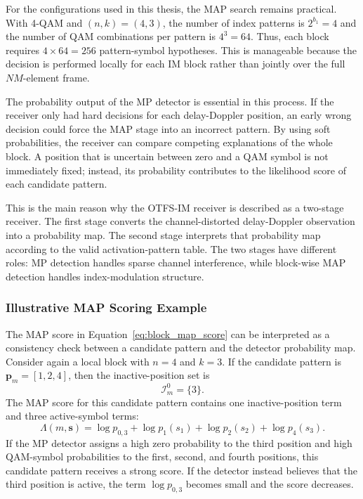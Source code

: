 For the configurations used in this thesis, the MAP search remains practical. With 4-QAM and \((n,k)=(4,3)\), the number of index patterns is \(2^{b_1}=4\) and the number of QAM combinations per pattern is \(4^3=64\). Thus, each block requires \(4\times64=256\) pattern-symbol hypotheses. This is manageable because the decision is performed locally for each IM block rather than jointly over the full \(NM\)-element frame.

The probability output of the MP detector is essential in this process. If the receiver only had hard decisions for each delay-Doppler position, an early wrong decision could force the MAP stage into an incorrect pattern. By using soft probabilities, the receiver can compare competing explanations of the whole block. A position that is uncertain between zero and a QAM symbol is not immediately fixed; instead, its probability contributes to the likelihood score of each candidate pattern.

This is the main reason why the OTFS-IM receiver is described as a two-stage receiver. The first stage converts the channel-distorted delay-Doppler observation into a probability map. The second stage interprets that probability map according to the valid activation-pattern table. The two stages have different roles: MP detection handles sparse channel interference, while block-wise MAP detection handles index-modulation structure.

\subsubsection{Illustrative MAP Scoring Example}

The MAP score in Equation~\eqref{eq:block_map_score} can be interpreted as a consistency check between a candidate pattern and the detector probability map. Consider again a local block with \(n=4\) and \(k=3\). If the candidate pattern is \(\mathbf{p}_m=[1,2,4]\), then the inactive-position set is
\begin{equation}
    \mathcal{I}_{m}^{0}=\{3\}.
\end{equation}
The MAP score for this candidate pattern contains one inactive-position term and three active-symbol terms:
\begin{equation}
    \Lambda(m,\mathbf{s})
    =
    \log p_{0,3}
    +
    \log p_{1}(s_1)
    +
    \log p_{2}(s_2)
    +
    \log p_{4}(s_3).
    \label{eq:map_score_example}
\end{equation}
If the MP detector assigns a high zero probability to the third position and high QAM-symbol probabilities to the first, second, and fourth positions, this candidate pattern receives a strong score. If the detector instead believes that the third position is active, the term \(\log p_{0,3}\) becomes small and the score decreases.

